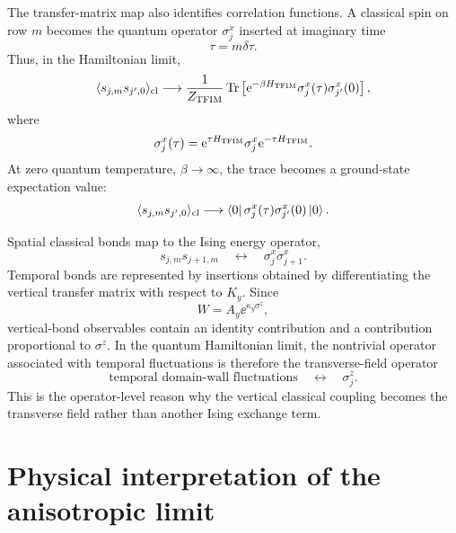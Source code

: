 The transfer-matrix map also identifies correlation functions.  A classical spin
on row $m$ becomes the quantum operator $\sigma_j^x$ inserted at imaginary time
\begin{equation}
    \tau=m\delta\tau .
\end{equation}
Thus, in the Hamiltonian limit,
\begin{equation}
\label{eq:ising-tfim-spin-correlator-map}
    \langle s_{j,m}s_{j',0}\rangle_{\rm cl}
    \longrightarrow
    \frac{1}{Z_{\rm TFIM}}
    \operatorname{Tr}\left[
        \mathrm{e}^{-\beta H_{\rm TFIM}}
        \sigma_j^x(\tau)\sigma_{j'}^x(0)
    \right],
\end{equation}
where
\begin{equation}
\label{eq:ising-tfim-imaginary-time-heisenberg}
    \sigma_j^x(\tau)
    =
    \mathrm{e}^{\tau H_{\rm TFIM}}\sigma_j^x\mathrm{e}^{-\tau H_{\rm TFIM}} .
\end{equation}
At zero quantum temperature, $\beta\to\infty$, the trace becomes a ground-state
expectation value:
\begin{equation}
\label{eq:ising-tfim-zero-temperature-correlator}
    \langle s_{j,m}s_{j',0}\rangle_{\rm cl}
    \longrightarrow
    \left\langle 0\right|\sigma_j^x(\tau)\sigma_{j'}^x(0)\left|0\right\rangle .
\end{equation}

Spatial classical bonds map to the Ising energy operator,
\begin{equation}
\label{eq:ising-tfim-spatial-bond-map}
    s_{j,m}s_{j+1,m}
    \quad\longleftrightarrow\quad
    \sigma_j^x\sigma_{j+1}^x .
\end{equation}
Temporal bonds are represented by insertions obtained by differentiating the
vertical transfer matrix with respect to $K_y$.  Since
\begin{equation}
    W=A_y\ee^{\kappa_y\sigma^z},
\end{equation}
vertical-bond observables contain an identity contribution and a contribution
proportional to $\sigma^z$.  In the quantum Hamiltonian limit, the nontrivial
operator associated with temporal fluctuations is therefore the transverse-field
operator
\begin{equation}
\label{eq:ising-tfim-temporal-bond-map}
    \text{temporal domain-wall fluctuations}
    \quad\longleftrightarrow\quad
    \sigma_j^z .
\end{equation}
This is the operator-level reason why the vertical classical coupling becomes
the transverse field rather than another Ising exchange term.

\section{Physical interpretation of the anisotropic limit}
\label{sec:ising-tfim-physical-interpretation}

